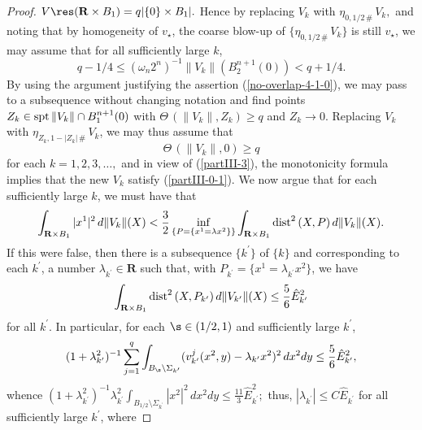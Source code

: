 \documentclass[a4paper,11pt]{amsart}
\begin{document}
\begin{proof}
$V\res ({\mathbf R} \times B_{1}) = q|\{0\} \times B_{1}|.$ Hence by replacing $V_{k}$ with 
$\eta_{0, 1/2 \, \#} \, V_{k},$  and noting that by homogeneity of $v_{\star}$, the coarse blow-up of $\{\eta_{0, 1/2 \, \#} \, V_{k}\}$ is still $v_{\star}$, we may assume that for all sufficiently large $k$,
\begin{equation}\label{partIII-3}
q - 1/4 \leq (\omega_{n}2^{n})^{-1}\|V_{k}\|(B_{2}^{n+1}(0)) < q + 1/4.
\end{equation}
By using the argument justifying the assertion (\ref{no-overlap-4-1-0}), we may pass to a subsequence without changing notation and find points $Z_{k} \in {\rm spt} \,\|V_{k}\|\cap B_{1}^{n+1}(0)$ with $\Theta \, (\|V_{k}\|, Z_{k}) \geq q$ and $Z_{k} \to 0.$ Replacing $V_{k}$ with $\eta_{Z_{k}, 1 - |Z_{k}| \, \#} \,V_{k}$, we may thus assume that 
\begin{equation}\label{partIII-4}
\Theta \, (\|V_{k}\|, 0) \geq q
\end{equation}
for each $k=1,2,3, \ldots,$ and in view of (\ref{partIII-3}), the monotonicity formula implies that the new $V_{k}$ satisfy (\ref{partIII-0-1}). We now argue that for each sufficiently large $k$, we must have that  
\begin{equation}\label{partIII-4-0-1}
\int_{{\mathbf R} \times B_{1}}|x^{1}|^{2} \, d\|V_{k}\|(X)  <\frac{3}{2} \inf_{\{P = \{x^{1} = \lambda x^{2}\}\}} \int_{{\mathbf R} \times B_{1}}{\rm dist}^{2} \, (X, P) \, d\|V_{k}\|(X).
\end{equation}
If this were false, then there is a subsequence $\{k^{\prime}\}$ of $\{k\}$ and corresponding to each $k^{\prime}$,
a number $\lambda_{k^{\prime}} \in {\mathbf R}$ such that, with $P_{k^{\prime}} = \{x^{1} = \lambda_{k^{\prime}} x^{2}\}$,
we have 
$$\int_{{\mathbf R} \times B_{1}}{\rm dist}^{2} \, (X, P_{k^{\prime}}) \, d\|V_{k^{\prime}}\|(X) \leq \frac{5}{6}{\hat E}^{2}_{k^{\prime}}$$
for all $k^{\prime}.$ In particular, for each $\s \in (1/2, 1)$ and sufficiently large $k^{\prime}$, 
\begin{equation}\label{partIII-4-0-2}
(1 + \lambda_{k^{\prime}}^{2})^{-1}\sum_{j=1}^{q}\int_{B_{\s} \setminus \Sigma_{k^{\prime}}} (v^{j}_{k^{\prime}}(x^{2},y) - \lambda_{k^{\prime}}x^{2})^{2} \, dx^{2}dy \leq \frac{5}{6}{\hat E}_{k^{\prime}}^{2},
\end{equation}
whence $(1 + \lambda_{k^{\prime}}^{2})^{-1}\lambda_{k^{\prime}}^{2}\int_{B_{1/2} \setminus \Sigma_{k^{\prime}}}|x^{2}|^{2} \, dx^{2}dy \leq \frac{11}{3}{\hat E}_{k^{\prime}}^{2};$ thus, $|\lambda_{k^{\prime}}| \leq C{\hat E}_{k^{\prime}}$ for all sufficiently large $k^{\prime}$, where 

\end{proof}
\end{document}
